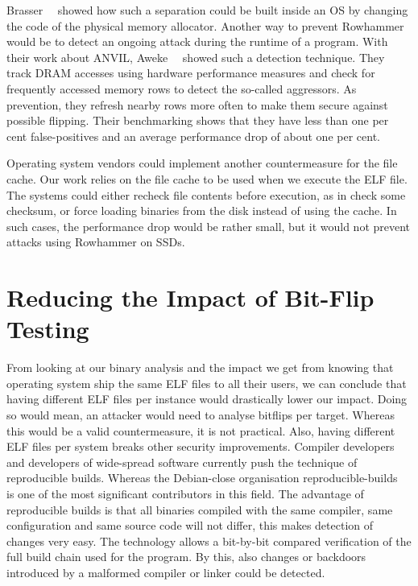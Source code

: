 Brasser~\etal~\cite{canttouch} showed how such a separation could be built
inside an OS by changing the code of the physical memory allocator. Another
way to prevent Rowhammer would be to detect an ongoing attack during the runtime
of a program. With their work about ANVIL, Aweke~\etal~\cite{anvil} showed such
a detection technique. They track DRAM accesses using hardware performance
measures and check for frequently accessed memory rows to detect the so-called
aggressors. As prevention, they refresh nearby rows more often to make them
secure against possible flipping. Their benchmarking shows that they have less
than one per cent false-positives and an average performance drop of about one
per cent.

Operating system vendors could implement another countermeasure for the file
cache. Our work relies on the file cache to be used when we execute the ELF
file. The systems could either recheck file contents before execution, as
in check some checksum, or force loading binaries from the disk instead of
using the cache. In such cases, the performance drop would be rather small, but
it would not prevent attacks using Rowhammer on SSDs.

\section{Reducing the Impact of Bit-Flip Testing}

From looking at our binary analysis and the impact we get from knowing that
operating system ship the same ELF files to all their users, we can conclude
that having different ELF files per instance would drastically lower our impact.
Doing so would mean, an attacker would need to analyse bitflips per target.
Whereas this would be a valid countermeasure, it is not practical. Also, having
different ELF files per system breaks other security improvements. Compiler
developers and developers of wide-spread software currently push the technique
of reproducible builds. Whereas the Debian-close organisation
reproducible-builds~\cite{reprobuilds} is one of the most significant
contributors in this field. The advantage of reproducible builds is that all
binaries compiled with the same compiler, same configuration and same
source code will not differ, this makes detection of changes very easy. The
technology allows a bit-by-bit compared verification of the full build chain
used for the program. By this, also changes or backdoors introduced by a
malformed compiler or linker could be detected.

